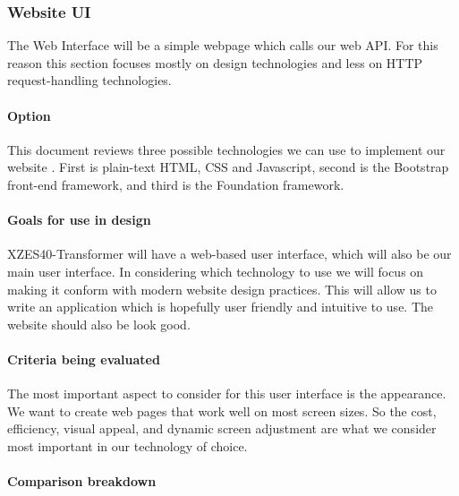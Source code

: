 \subsubsection{Website UI}

The Web Interface will be a simple webpage which calls our web API.
For this reason this section focuses mostly on design technologies and less on HTTP request-handling technologies.

\paragraph{Option}

This document reviews three possible technologies we can use to implement our website .
First is plain-text HTML, CSS and Javascript, second is the Bootstrap front-end framework, and third is the Foundation framework.

\paragraph{Goals for use in design}

XZES40-Transformer will have a web-based user interface, which will also be our main user interface.
In considering which technology to use we will focus on making it conform with modern website design practices.
This will allow us to write an application which is hopefully user friendly and intuitive to use.
The website should also be look good.

\paragraph{Criteria being evaluated}

The most important aspect to consider for this user interface is the appearance.
We want to create web pages that work well on most screen sizes.
So the cost, efficiency, visual appeal, and dynamic screen adjustment are what we consider most important in our technology of choice.

\paragraph{Comparison breakdown}

